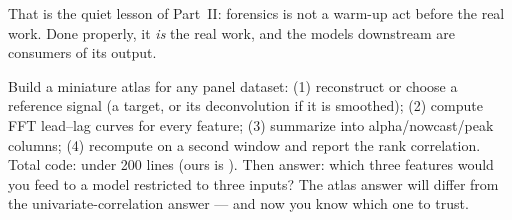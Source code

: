 That is the quiet lesson of Part~II: forensics is not a warm-up act before
the real work. Done properly, it \emph{is} the real work, and the models
downstream are consumers of its output.

\begin{drillbox}
Build a miniature atlas for any panel dataset: (1) reconstruct or choose a
reference signal (a target, or its deconvolution if it is smoothed);
(2) compute FFT lead--lag curves for every feature; (3) summarize into
alpha/nowcast/peak columns; (4) recompute on a second window and report the
rank correlation. Total code: under 200 lines (ours is
). Then answer: which three features
would you feed to a model restricted to three inputs? The atlas answer will
differ from the univariate-correlation answer --- and now you know which one
to trust.
\end{drillbox}

